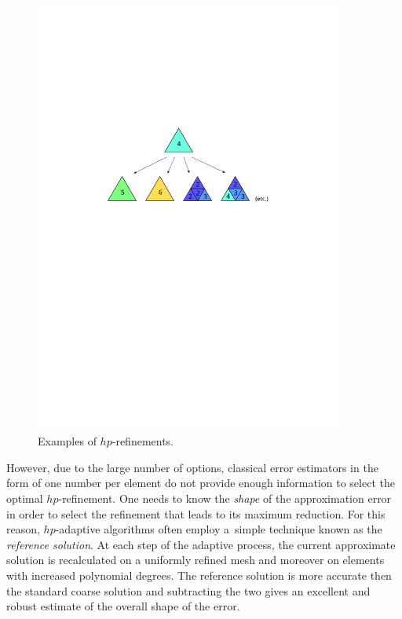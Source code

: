 \begin{figure}[ht]
  \medskip \centering
  \includegraphics[width=0.9\textwidth]{img/refinements}
  \caption{Examples of $hp$-refinements.}
  \label{fig:refinements}
\end{figure}

However, due to the large number of options, classical error estimators in the form of one
number per element do not provide enough information to select the optimal $hp$-refinement.
One needs to know the {\it shape} of the approximation error in order to select the refinement
that leads to its maximum reduction. For this reason, $hp$-adaptive algorithms often employ
a~simple technique known as the {\it reference solution}. At each step of the adaptive process,
the current approximate solution is recalculated on a uniformly refined mesh and moreover
on elements with increased polynomial degrees. The reference solution is more accurate then
the standard coarse solution and subtracting the two gives an excellent and robust estimate 
of the overall shape of the error.

